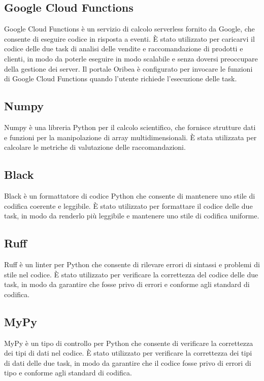 \subsection{Google Cloud Functions}
Google Cloud Functions è un servizio di calcolo serverless fornito da Google, che consente di eseguire codice in risposta a eventi. È stato utilizzato per caricarvi il codice delle due task di analisi delle vendite e raccomandazione di prodotti e clienti, in modo da poterle eseguire in modo scalabile e senza doversi preoccupare della gestione dei server. Il portale Oribea è configurato per invocare le funzioni di Google Cloud Functions quando l'utente richiede l'esecuzione delle task.

\subsection{Numpy}
Numpy è una libreria Python per il calcolo scientifico, che fornisce strutture dati e funzioni per la manipolazione di array multidimensionali. È stata utilizzata per calcolare le metriche di valutazione delle raccomandazioni.

\subsection{Black}
Black è un formattatore di codice Python che consente di mantenere uno stile di codifica coerente e leggibile. È stato utilizzato per formattare il codice delle due task, in modo da renderlo più leggibile e mantenere uno stile di codifica uniforme.

\subsection{Ruff}
Ruff è un linter per Python che consente di rilevare errori di sintassi e problemi di stile nel codice. È stato utilizzato per verificare la correttezza del codice delle due task, in modo da garantire che fosse privo di errori e conforme agli standard di codifica.

\subsection{MyPy}
MyPy è un tipo di controllo per Python che consente di verificare la correttezza dei tipi di dati nel codice. È stato utilizzato per verificare la correttezza dei tipi di dati delle due task, in modo da garantire che il codice fosse privo di errori di tipo e conforme agli standard di codifica.

